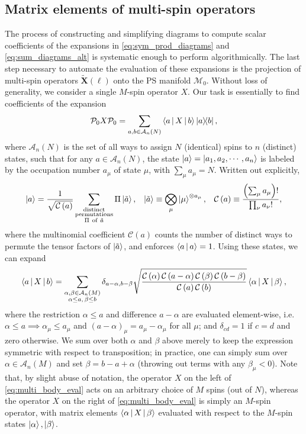 \documentclass[nofootinbib,notitlepage,11pt]{revtex4-2}
\renewcommand{\t}{\text} %
\newcommand{\f}[2]{\dfrac{#1}{#2}} %
\newcommand{\p}[1]{\left(#1\right)} %
\newcommand{\bk}{\Braket} %
\newcommand{\m}{\bm} %
\newcommand{\1}{\mathds{1}}
\newcommand{\A}{\mathcal{A}}
\newcommand{\C}{\mathcal{C}}
\newcommand{\M}{\mathcal{M}}
\renewcommand{\P}{\mathcal{P}}
\newcommand{\ot}{\widetilde}
\begin{document}
\subsection{Matrix elements of multi-spin operators}

The process of constructing and simplifying diagrams to compute scalar
coefficients of the expansions in \eqref{eq:sym_prod_diagrams} and
\eqref{eq:sum_diagrams_alt} is systematic enough to perform
algorithmically.  The last step necessary to automate the evaluation
of these expansions is the projection of multi-spin operators
$\ot{\m X}\p{\ell}$ onto the PS manifold $\M_0$.  Without loss of
generality, we consider a single $M$-spin operator $X$.  Our task is
essentially to find coefficients of the expansion
\begin{align}
  \P_0 X \P_0
  = \sum_{a,b\in\A_n\p{N}} \bk{a|X|b} \op{a}{b},
\end{align}
where $\A_n\p{N}$ is the set of all ways to assign $N$ (identical)
spins to $n$ (distinct) states, such that for any $a\in\A_n\p{N}$, the
state $\ket{a}=\ket{a_1,a_2,\cdots,a_n}$ is labeled by the occupation
number $a_\mu$ of state $\mu$, with $\sum_\mu a_\mu = N$.  Written out
explicitly,
\begin{align}
  \ket{a} = \f1{\sqrt{\C\p{a}}}
  \sum_{\substack{\t{distinct}\\\t{permutations}\\\Pi~\t{of}~\tilde a}}
  \Pi \ket{\tilde a},
  &&
  \ket{\tilde a} \equiv \bigotimes_\mu \ket{\mu}^{\otimes a_\mu},
  &&
  \C\p{a} \equiv \f{\p{\sum_\mu a_\mu}!}{\prod_\nu a_\nu!},
\end{align}
where the multinomial coefficient $\C\p{a}$ counts the number of
distinct ways to permute the tensor factors of $\ket{\tilde a}$, and
enforces $\bk{a|a}=1$.  Using these states, we can expand
\begin{align}
  \bk{a|X|b}
  = \sum_{\substack{\alpha,\beta\in\A_n\p{M}\\\alpha\le a,\,\beta\le b}}
  \delta_{a-\alpha,b-\beta}
  \sqrt{\f{\C\p{\alpha}\C\p{a-\alpha}\C\p{\beta}\C\p{b-\beta}}
    {\C\p{a}\C\p{b}}}
  \bk{\alpha|X|\beta},
  \label{eq:multi_body_eval}
\end{align}
where the restriction $\alpha\le a$ and difference $a-\alpha$ are
evaluated element-wise, i.e.~$\alpha\le a\implies \alpha_\mu\le a_\mu$
and $\p{a-\alpha}_\mu=a_\mu-\alpha_\mu$ for all $\mu$; and
$\delta_{cd}=1$ if $c=d$ and zero otherwise.  We sum over both
$\alpha$ and $\beta$ above merely to keep the expression symmetric
with respect to transposition; in practice, one can simply sum over
$\alpha\in\A_n\p{M}$ and set $\beta=b-a+\alpha$ (throwing out terms
with any $\beta_\mu<0$).  Note that, by slight abuse of notation, the
operator $X$ on the left of \eqref{eq:multi_body_eval} acts on an
arbitrary choice of $M$ spins (out of $N$), whereas the operator $X$
on the right of \eqref{eq:multi_body_eval} is simply an $M$-spin
operator, with matrix elements $\bk{\alpha|X|\beta}$ evaluated with
respect to the $M$-spin states $\ket\alpha,\ket\beta$.
\end{document}
